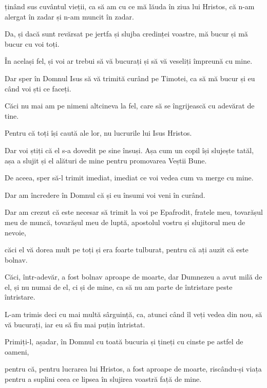 {ținând sus cuvântul vieții, ca să am cu ce mă lăuda în ziua lui Hristos, că n-am alergat în zadar și n-am muncit în zadar.

Da, și dacă sunt revărsat pe jertfa și slujba credinței voastre, mă bucur și mă bucur cu voi toți.

În același fel, și voi ar trebui să vă bucurați și să vă veseliți împreună cu mine.


\par }{\PP {}Dar sper în Domnul Isus să vă trimită curând pe Timotei, ca să mă bucur și eu când voi ști ce faceți.

Căci nu mai am pe nimeni altcineva la fel, care să se îngrijească cu adevărat de tine.

Pentru că toți își caută ale lor, nu lucrurile lui Isus Hristos.

Dar voi știți că el s-a dovedit pe sine însuși. Așa cum un copil își slujește tatăl, așa a slujit și el alături de mine pentru promovarea Veștii Bune.

De aceea, sper să-l trimit imediat, imediat ce voi vedea cum va merge cu mine.

Dar am încredere în Domnul că și eu însumi voi veni în curând.


\par }{\PP {}Dar am crezut că este necesar să trimit la voi pe Epafrodit, fratele meu, tovarășul meu de muncă, tovarășul meu de luptă, apostolul vostru și slujitorul meu de nevoie,

căci el vă dorea mult pe toți și era foarte tulburat, pentru că ați auzit că este bolnav.

Căci, într-adevăr, a fost bolnav aproape de moarte, dar Dumnezeu a avut milă de el, și nu numai de el, ci și de mine, ca să nu am parte de întristare peste întristare.

L-am trimis deci cu mai multă sârguință, ca, atunci când îl veți vedea din nou, să vă bucurați, iar eu să fiu mai puțin întristat.

Primiți-l, așadar, în Domnul cu toată bucuria și țineți cu cinste pe astfel de oameni,

pentru că, pentru lucrarea lui Hristos, a fost aproape de moarte, riscându-și viața pentru a suplini ceea ce lipsea în slujirea voastră față de mine.



\par }
